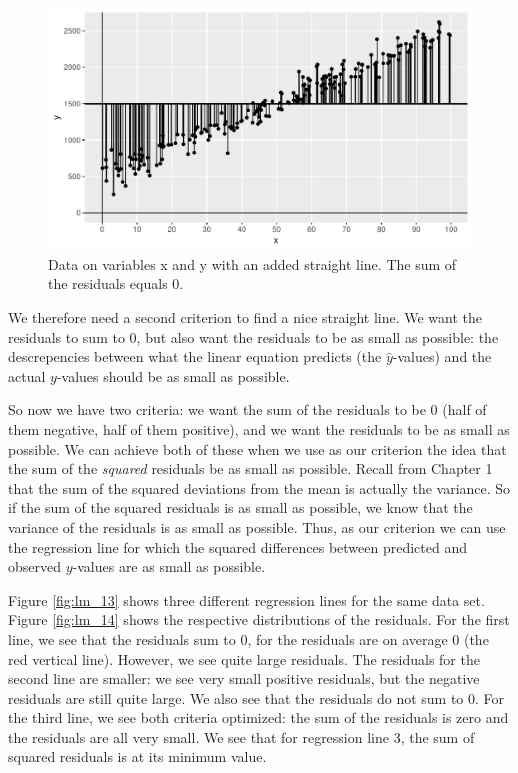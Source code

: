 \documentclass[]{book}\usepackage[]{graphicx}\usepackage[]{color}
\makeatletter
\def\maxwidth{ %
  \ifdim\Gin@nat@width>\linewidth
    \linewidth
  \else
    \Gin@nat@width
  \fi
}
\newenvironment{knitrout}{}{} %
\makeatother
\begin{document}
\begin{knitrout}
\color{fgcolor}\begin{figure}

{\centering \includegraphics[width=\maxwidth]{figure/lm_12-1} 

}

\caption[Data on variables x and y with an added straight line]{Data on variables x and y with an added straight line. The sum of the residuals equals 0.}\label{fig:lm_12}
\end{figure}


\end{knitrout}

We therefore need a second criterion to find a nice straight line. We want the residuals to sum to 0, but also want the residuals to be as small as possible: the descrepencies between what the linear equation predicts (the $\hat{y}$-values) and the actual $y$-values should be as small as possible.

So now we have two criteria: we want the sum of the residuals to be 0 (half of them negative, half of them positive), and we want the residuals to be as small as possible. We can achieve both of these when we use as our criterion the idea that the sum of the \textit{squared} residuals be as small as possible. Recall from Chapter 1 that the sum of the squared deviations from the mean is actually the variance. So if the sum of the squared residuals is as small as possible, we know that the variance of the residuals is as small as possible. Thus, as our criterion we can use the regression line for which the squared differences between predicted and observed $y$-values are as small as possible.

Figure \ref{fig:lm_13} shows three different regression lines for the same data set. Figure \ref{fig:lm_14} shows the respective distributions of the residuals. For the first line, we see that the residuals sum to 0, for the residuals are on average 0 (the red vertical line). However, we see quite large residuals. The residuals for the second line are smaller: we see very small positive residuals, but the negative residuals are still quite large. We also see that the residuals do not sum to 0. For the third line, we see both criteria optimized: the sum of the residuals is zero and the residuals are all very small. We see that for regression line 3, the sum of squared residuals is at its minimum value.
\end{document}
